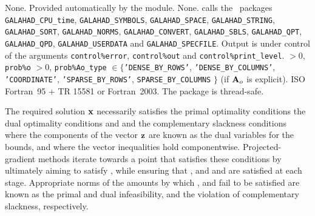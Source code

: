 \documentclass{galahad}
\newcommand{\packagename}{BLLS}
\begin{document}

\galgeneral

\galcommon None.
\galworkspace Provided automatically by the module.
\galroutines None.
\galmodules {\tt \packagename\_solve} calls the \galahad\ packages
{\tt GALAHAD\_CPU\_time},
{\tt GALAHAD\_SY\-M\-BOLS}, \newline
{\tt GALAHAD\_SPACE},
{\tt GALAHAD\_STRING},
{\tt GALAHAD\_SORT},
{\tt GALAHAD\_NORMS},
{\tt GALAHAD\_CONVERT},
{\tt GALAHAD\_SBLS}, \newline
{\tt GALAHAD\_QPT},
{\tt GALAHAD\_QPD},
{\tt GALAHAD\_USERDATA} and
{\tt GALAHAD\_SPECFILE}.
\galio Output is under control of the arguments
 {\tt control\%error}, {\tt control\%out} and {\tt control\%print\_level}.
 $> 0$, {\tt prob\%o} $> 0$,
{\tt prob\%Ao\_type} $\in \{${\tt 'DENSE\_BY\_ROWS'}, 
{\tt 'DENSE\_BY\_COLUMNS'}, {\tt 'COORDINATE'}, 
{\tt 'SPARSE\_BY\_\-ROWS'},  {\tt SPARSE\_BY\_COLUMNS} $\}$
(if ${\mathbf{A}}_o$ is explicit).
\galportability ISO Fortran~95 + TR 15581 or Fortran~2003.
The package is thread-safe.


\galmethod
The required solution ${\mathbf{x}}$ necessarily satisfies
the primal optimality conditions
the dual optimality conditions
and
and the complementary slackness conditions
where the components of the vector ${\mathbf{z}}$ are known as
the dual variables for the bounds,
and where the vector inequalities hold componentwise.
Projected-gradient methods iterate towards a point
that satisfies these conditions by ultimately aiming to satisfy
, while ensuring that
, and  and  are satisfied at each stage.
Appropriate norms of the amounts by
which ,  and  fail to be satisfied are known as the
primal and dual infeasibility, and the violation of complementary slackness,
respectively.
\end{document}

